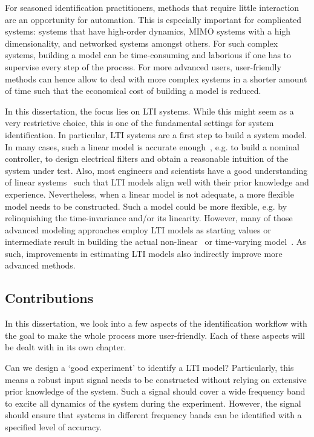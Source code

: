 For seasoned identification practitioners, methods that require little interaction are an opportunity for automation.
This is especially important for complicated systems: systems that have high-order dynamics, \gls{MIMO} systems with a high dimensionality, and networked systems amongst others.
For such complex systems, building a model can be time-consuming and laborious if one has to supervise every step of the process.
For more advanced users, user-friendly methods can hence allow to deal with more complex systems in a shorter amount of time such that the economical cost of building a model is reduced.

In this dissertation, the focus lies on \gls{LTI} systems.
While this might seem as a very restrictive choice, this is one of the fundamental settings for system identification.
In particular, \gls{LTI} systems are a first step to build a system model.
In many cases, such a linear model is accurate enough~\citep{Schoukens2004}, e.g. to build a nominal controller, to design electrical filters and obtain a reasonable intuition of the system under test.
Also, most engineers and scientists have a good understanding of linear systems~\citep{Oppenheim1996,Mandal2007,Kailath1980} such that \gls{LTI} models align well with their prior knowledge and experience.
Nevertheless, when a linear model is not adequate, a more flexible model needs to be constructed.
Such a model could be more flexible, e.g. by relinquishing the time-invariance and/or its linearity.
However, many of those advanced modeling approaches employ \gls{LTI} models as starting values or intermediate result in building the actual non-linear~\citep{Giri2010} or time-varying model~\citep{Lataire2012,Louarroudi2014}.
As such, improvements in estimating \gls{LTI} models also indirectly improve more advanced methods.


\subsection{Contributions}
In this dissertation, we look into a few aspects of the identification workflow with the goal to make the whole process more user-friendly.
Each of these aspects will be dealt with in its own chapter.

\begin{question}
Can we design a `good experiment' to identify a \gls{LTI} model?
Particularly, this means a robust input signal needs to be constructed without relying on extensive prior knowledge of the system.
Such a signal should cover a wide frequency band to excite all dynamics of the system during the experiment.
However, the signal should ensure that systems in different frequency bands can be identified with a specified level of accuracy.
\end{question}

